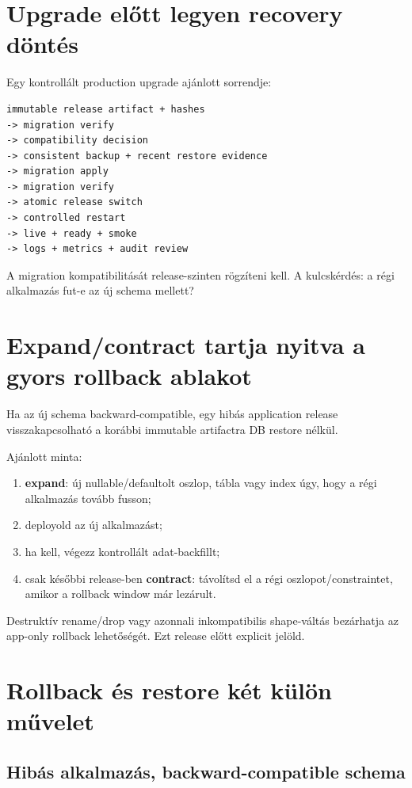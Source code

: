 \section{Upgrade előtt legyen recovery döntés}

Egy kontrollált production upgrade ajánlott sorrendje:

\begin{lstlisting}
immutable release artifact + hashes
-> migration verify
-> compatibility decision
-> consistent backup + recent restore evidence
-> migration apply
-> migration verify
-> atomic release switch
-> controlled restart
-> live + ready + smoke
-> logs + metrics + audit review
\end{lstlisting}

A migration kompatibilitását release-szinten rögzíteni kell. A kulcskérdés: a régi alkalmazás fut-e az új schema mellett?

\section{Expand/contract tartja nyitva a gyors rollback ablakot}

Ha az új schema backward-compatible, egy hibás application release visszakapcsolható a korábbi immutable artifactra DB restore nélkül.

Ajánlott minta:

\begin{enumerate}
  \item \textbf{expand}: új nullable/defaultolt oszlop, tábla vagy index úgy, hogy a régi alkalmazás tovább fusson;
  \item deployold az új alkalmazást;
  \item ha kell, végezz kontrollált adat-backfillt;
  \item csak későbbi release-ben \textbf{contract}: távolítsd el a régi oszlopot/constraintet, amikor a rollback window már lezárult.
\end{enumerate}

Destruktív rename/drop vagy azonnali inkompatibilis shape-váltás bezárhatja az app-only rollback lehetőségét. Ezt release előtt explicit jelöld.

\section{Rollback és restore két külön művelet}

\subsection*{Hibás alkalmazás, backward-compatible schema}

